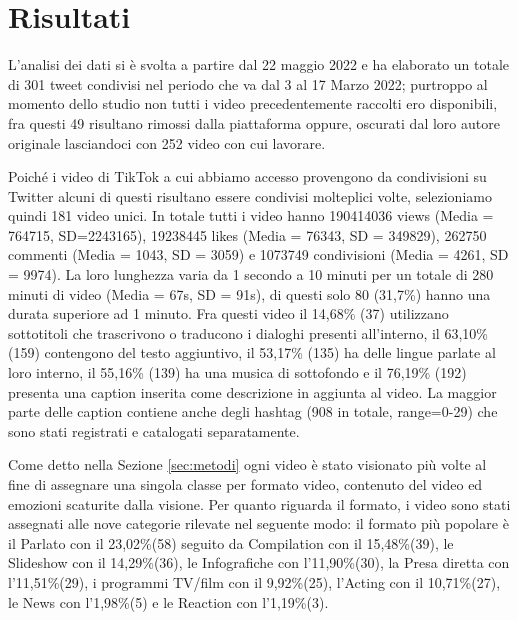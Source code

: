 \section{Risultati}
\label{risultati}

L'analisi dei dati si è svolta a partire dal 22 maggio 2022 e ha elaborato un totale di 301 tweet condivisi nel periodo 
che va dal 3 al 17 Marzo 2022; purtroppo al momento dello studio non tutti i video precedentemente raccolti 
ero disponibili, fra questi 49 risultano rimossi dalla piattaforma oppure, oscurati dal loro autore originale lasciandoci
con 252 video con cui lavorare. 

Poiché i video di TikTok a cui abbiamo accesso provengono da condivisioni su Twitter alcuni di questi risultano essere 
condivisi molteplici volte, selezioniamo quindi 181 video unici. 
In totale tutti i video hanno 190414036 views (Media = 764715, SD=2243165), 19238445 likes (Media = 76343, SD = 349829), 
262750 commenti (Media = 1043, SD = 3059) e 1073749 condivisioni (Media = 4261, SD = 9974). 
La loro lunghezza varia da 1 secondo a 10 minuti per un totale di 280 minuti di video (Media = 67s, SD = 91s), di questi 
solo 80 (31,7\%) hanno una durata superiore ad 1 minuto. 
Fra questi video il 14,68\% (37) utilizzano sottotitoli che trascrivono o traducono i dialoghi presenti all'interno, il 
63,10\% (159) contengono del testo aggiuntivo, il 53,17\% (135) ha delle lingue parlate al loro interno, il 55,16\% (139) 
ha una musica di sottofondo e il 76,19\% (192) presenta una caption inserita come descrizione in aggiunta al video.
La maggior parte delle caption contiene anche degli hashtag (908 in totale, range=0-29) che sono stati registrati e catalogati
separatamente.

Come detto nella Sezione \ref{sec:metodi} ogni video è stato visionato più volte al fine di assegnare una singola classe per 
formato video, contenuto del video ed emozioni scaturite dalla visione.
Per quanto riguarda il formato, i video sono stati assegnati alle nove categorie rilevate nel seguente modo: il 
formato più popolare è il Parlato con il 23,02\%(58) seguito da Compilation con il 15,48\%(39), le Slideshow con il 14,29\%(36), 
le Infografiche con l'11,90\%(30), la Presa diretta con l'11,51\%(29), i programmi TV/film con il 9,92\%(25), l'Acting 
con il 10,71\%(27), le News con l'1,98\%(5) e le Reaction con l'1,19\%(3).

